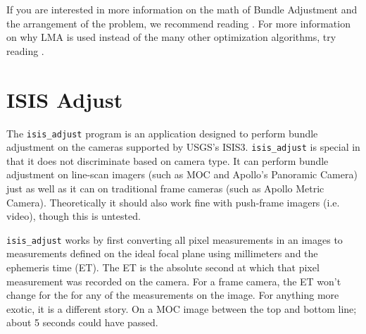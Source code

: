 If you are interested in more information on the math of Bundle
Adjustment and the arrangement of the problem, we recommend reading
\citet[][Appendix 6]{hartley04}.
For more information on why LMA is used instead of the many other
optimization algorithms, try reading \citet{triggs00}.


\section{ISIS Adjust}

The \texttt{isis\_adjust} program is an application designed to
perform bundle adjustment on the cameras supported by USGS's
ISIS3. \texttt{isis\_adjust} is special in that it does not
discriminate based on camera type. It can perform bundle adjustment on
line-scan imagers (such as MOC and Apollo's Panoramic Camera) just as
well as it can on traditional frame cameras (such as Apollo Metric
Camera). Theoretically it should also work fine with push-frame
imagers (i.e. video), though this is untested.

\texttt{isis\_adjust} works by first converting all pixel measurements
in an images to measurements defined on the ideal focal
plane using millimeters and the ephemeris time (ET). The ET is the
absolute second at which that pixel measurement was recorded on the camera. 
For a frame camera, the ET won't change for the for
any of the measurements on the image. For anything more exotic, it is
a different story. On a MOC image between the top and bottom line;
about 5 seconds could have passed.

\begin{figure}
\vspace{-30pt}
\begin{center}
\end{center}
\vspace{-30pt}
\end{figure}

